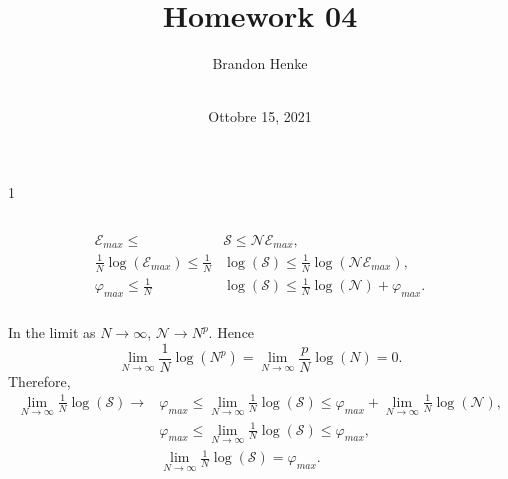 \documentclass[a4paper,12pt,twoside]{article}
\title{Homework 04}
\author{
	Brandon Henke\\
	\course\\
	\professor
}
\date{Ottobre 15, 2021}
\newcommand{\mcols}{0}
\begin{document}

\maketitle
\if\mcols1
\begin{multicols*}{2}
\fi

\setcounter{section}{4}
\subsection{}%
\subsubsection{}
\begin{align}
	\mathcal{E}_{max} \leq &\mathcal{S} \leq \mathcal{N} \mathcal{E}_{max},\\
	\frac{1}{N}\log(\mathcal{E}_{max}) \leq \frac{1}{N}&\log(\mathcal{S}) \leq \frac{1}{N}\log(\mathcal{N} \mathcal{E}_{max}),\\
	\varphi_{max} \leq \frac{1}{N}&\log(\mathcal{S}) \leq \frac{1}{N}\log(\mathcal{N}) + \varphi_{max}.
\end{align}
\subsubsection{}
In the limit as $N\rightarrow\infty$, $\mathcal{N} \rightarrow N^p$.
Hence
\begin{equation}
	\lim_{N\rightarrow \infty} \frac{1}{N} \log(N^p) = \lim_{N\rightarrow \infty} \frac{p}{N} \log(N) = 0.
\end{equation}
Therefore,
\begin{align}
	\lim_{N\rightarrow\infty} \frac{1}{N}\log(\mathcal{S}) \rightarrow &\varphi_{max}
	\leq \lim_{N\rightarrow\infty} \frac{1}{N}\log(\mathcal{S})
	\leq \varphi_{max}+ \lim_{N\rightarrow\infty} \frac{1}{N}\log(\mathcal{N}),\\
	&\varphi_{max}
	\leq \lim_{N\rightarrow\infty} \frac{1}{N}\log(\mathcal{S})
	\leq \varphi_{max},\\
	&\lim_{N\rightarrow\infty} \frac{1}{N}\log(\mathcal{S}) = \varphi_{max}.
\end{align}

\end{multicols*}
\end{document}
